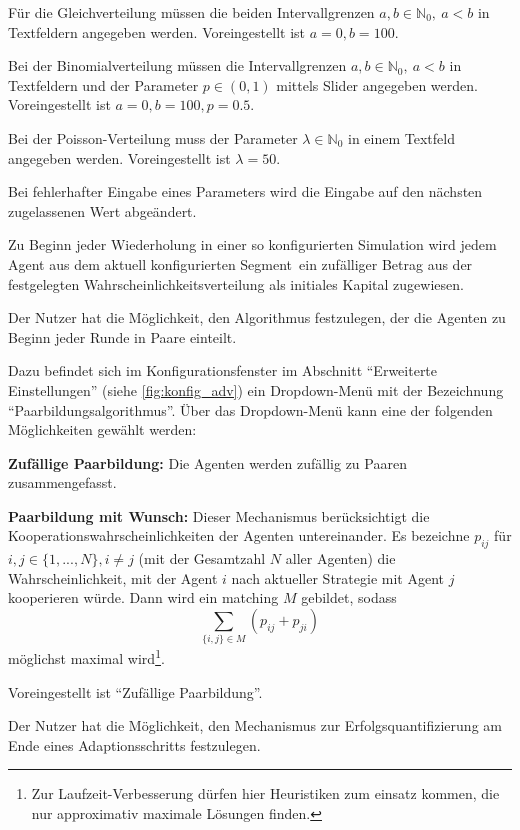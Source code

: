 \documentclass[parskip=full,11pt]{scrartcl}
\def\adapt{Adaptionsschritt}
\def\segment{Segment}
\begin{document}
Für die Gleichverteilung müssen die beiden Intervallgrenzen \(a,b \in \mathbb{N}_0, \ a < b\) in Textfeldern angegeben werden. Voreingestellt ist \(a = 0, b = 100\).

Bei der Binomialverteilung müssen die Intervallgrenzen \(a,b \in \mathbb{N}_0, \ a < b\) in Textfeldern und der Parameter \(p \in (0,1)\) mittels Slider angegeben werden. Voreingestellt ist \(a = 0, b = 100, p = 0.5\).

Bei der Poisson-Verteilung muss der Parameter \(\lambda \in \mathbb{N}_0\) in einem Textfeld angegeben werden. Voreingestellt ist \(\lambda = 50\).

Bei fehlerhafter Eingabe eines Parameters wird die Eingabe auf den nächsten zugelassenen Wert abgeändert.

Zu Beginn jeder Wiederholung in einer so konfigurierten Simulation wird jedem Agent aus dem aktuell konfigurierten \segment\ ein zufälliger Betrag aus der festgelegten Wahrscheinlichkeitsverteilung als initiales Kapital zugewiesen.


Der \Gls{Nutzer} hat die Möglichkeit, den Algorithmus festzulegen, der die Agenten zu Beginn jeder Runde in Paare einteilt.

Dazu befindet sich im Konfigurationsfenster im Abschnitt \enquote{Erweiterte Einstellungen} (siehe \cref{fig:konfig_adv}) ein Dropdown-Menü mit der Bezeichnung \enquote{Paarbildungsalgorithmus}. Über das Dropdown-Menü kann eine der folgenden Möglichkeiten gewählt werden:

\textbf{Zufällige Paarbildung:}
Die Agenten werden zufällig zu Paaren zusammengefasst.

\textbf{Paarbildung mit Wunsch:}
Dieser Mechanismus berücksichtigt die Kooperationswahrscheinlichkeiten der Agenten untereinander. Es bezeichne \(p_{ij}\) für \(i,j \in \{1,...,N\}, i \neq j\) (mit der Gesamtzahl \(N\) aller Agenten) die Wahrscheinlichkeit, mit der Agent \(i\) nach aktueller \Gls{Strategie} mit Agent \(j\) kooperieren würde. Dann wird ein \Gls{matching} \(M\) gebildet, sodass
\[
\sum_{\{i,j\} \in M} \left(p_{ij} + p_{ji}\right)
\]
möglichst maximal wird\footnote{Zur Laufzeit-Verbesserung dürfen hier Heuristiken zum einsatz kommen, die nur approximativ maximale Lösungen finden.}.

Voreingestellt ist \enquote{Zufällige Paarbildung}.

Der \Gls{Nutzer} hat die Möglichkeit, den Mechanismus zur Erfolgsquantifizierung am Ende eines \adapt s festzulegen.
\end{document}
